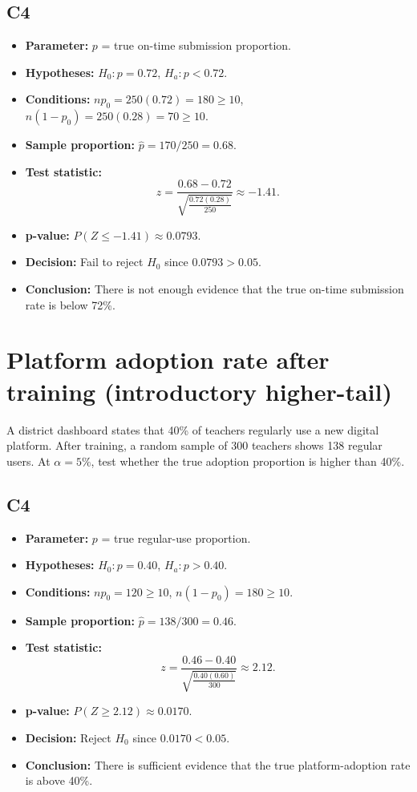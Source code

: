 \subsection*{C4}
\begin{itemize}
    \item \textbf{Parameter:} \(p\) = true on-time submission proportion.
    \item \textbf{Hypotheses:} \(H_0\colon p=0.72\), \(H_a\colon p<0.72\).
    \item \textbf{Conditions:} \(np_0=250(0.72)=180\ge10\), \(n(1-p_0)=250(0.28)=70\ge10\).
    \item \textbf{Sample proportion:} \(\hat p=170/250=0.68\).
    \item \textbf{Test statistic:}
    \[
    z=\frac{0.68-0.72}{\sqrt{\frac{0.72(0.28)}{250}}}\approx -1.41.
    \]
    \item \textbf{p-value:} \(P(Z\le -1.41)\approx 0.0793\).
    \item \textbf{Decision:} Fail to reject \(H_0\) since \(0.0793>0.05\).
    \item \textbf{Conclusion:} There is not enough evidence that the true on-time submission rate is below 72\%.
\end{itemize}

\begin{center}
\end{center}


\section{Platform adoption rate after training (introductory higher-tail)}
A district dashboard states that 40\% of teachers regularly use a new digital platform. After training, a random sample of 300 teachers shows 138 regular users. At \(\alpha=5\%\), test whether the true adoption proportion is higher than 40\%.

\subsection*{C4}
\begin{itemize}
    \item \textbf{Parameter:} \(p\) = true regular-use proportion.
    \item \textbf{Hypotheses:} \(H_0\colon p=0.40\), \(H_a\colon p>0.40\).
    \item \textbf{Conditions:} \(np_0=120\ge10\), \(n(1-p_0)=180\ge10\).
    \item \textbf{Sample proportion:} \(\hat p=138/300=0.46\).
    \item \textbf{Test statistic:}
    \[
    z=\frac{0.46-0.40}{\sqrt{\frac{0.40(0.60)}{300}}}\approx 2.12.
    \]
    \item \textbf{p-value:} \(P(Z\ge 2.12)\approx 0.0170\).
    \item \textbf{Decision:} Reject \(H_0\) since \(0.0170<0.05\).
    \item \textbf{Conclusion:} There is sufficient evidence that the true platform-adoption rate is above 40\%.
\end{itemize}


